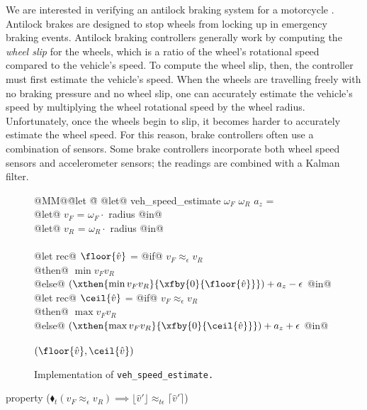
We are interested in verifying an antilock braking system for a motorcycle \cite{huang2010design}.
Antilock brakes are designed to stop wheels from locking up in emergency braking events.
Antilock braking controllers generally work by computing the \emph{wheel slip} for the wheels, which is a ratio of the wheel's rotational speed compared to the vehicle's speed.
To compute the wheel slip, then, the controller must first estimate the vehicle's speed.
When the wheels are travelling freely with no braking pressure and no wheel slip, one can accurately estimate the vehicle's speed by multiplying the wheel rotational speed by the wheel radius.
Unfortunately, once the wheels begin to slip, it becomes harder to accurately estimate the wheel speed.
For this reason, brake controllers often use a combination of sensors.
Some brake controllers \cite{kobayashi1995estimation} incorporate both wheel speed sensors and accelerometer sensors; the readings are combined with a Kalman filter.

\begin{figure}
\begin{tabbing}
  @MM@\= @let @\= \kill
  @let@ veh\_speed\_estimate $\omega_F$ $\omega_R$ $a_z$ = \\
    \> @let@ $v_F$ = $\omega_F \cdot $ radius @in@ \\
    \> @let@ $v_R$ = $\omega_R \cdot $ radius @in@ \\
    \\
    \> @let rec@ $\floor{\hat{v}}$ = @if@ $v_F \approx_\epsilon v_R$ \\
    \> \> @then@ $\min v_F v_R$ \\
    \> \> @else@ $(\xthen{\min v_F v_R}{\xfby{0}{\floor{\hat{v}}}}) + a_z - \epsilon$ @in@ \\
    \> @let rec@ $\ceil{\hat{v}}$ = @if@ $v_F \approx_\epsilon v_R$ \\
    \> \> @then@ $\max v_F v_R$ \\
    \> \> @else@ $(\xthen{\max v_F v_R}{\xfby{0}{\ceil{\hat{v}}}}) + a_z + \epsilon$ @in@ \\
    \\
    \> $(\floor{\hat{v}}, \ceil{\hat{v}})$
\end{tabbing}

\caption{Implementation of \tt{veh\_speed\_estimate}.}\label{f:veh-speed-estimate}
\end{figure}


property ($\blacklozenge_{t} (v_F \approx_{\epsilon} v_R) \implies \lfloor \hat{v}' \rfloor \approx_{t\epsilon} \lceil \hat{v}' \rceil$)



